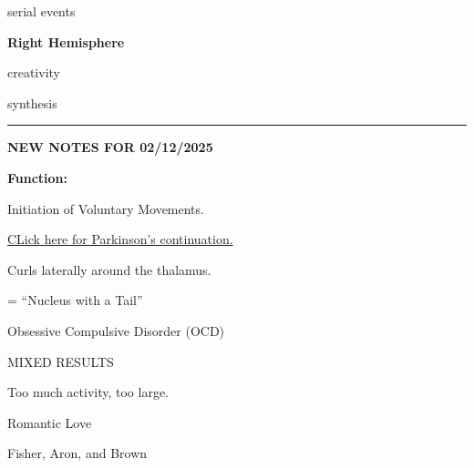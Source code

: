 \begin{coloredlist}
\begin{coloredlist}
\begin{coloredlist}
\begin{coloredlist}
                \item serial events
            \end{coloredlist}
            \item \textbf{Right Hemisphere}
            \begin{coloredlist}
                \item creativity
                \item synthesis
            \end{coloredlist}
        \end{coloredlist}
    \end{coloredlist}
    \begin{center}
        \hrule
        \textbf{NEW NOTES FOR 02/12/2025}
    \end{center}
    \item {}
    \begin{coloredlist}
    \item \textbf{Function:}
    \begin{coloredlist}
        \item Initiation of Voluntary Movements.
        \item \hyperref[parkinson]{CLick here for Parkinson's continuation.}
    \end{coloredlist}
    \item Curls laterally around the thalamus.
    \item {}
    \begin{coloredlist}
        \item {} = ``Nucleus with a Tail''
        \begin{coloredlist}
            \item Obsessive Compulsive Disorder (OCD)
            \begin{coloredlist}
                \item MIXED RESULTS
                \begin{coloredlist}
                    \item Too much activity, too large.
                \end{coloredlist}
            \end{coloredlist}
            \item Romantic Love
            \begin{coloredlist}
                \item Fisher, Aron, and Brown
                \begin{coloredlist}

\end{coloredlist}
\end{coloredlist}
\end{coloredlist}
\end{coloredlist}
\end{coloredlist}
\end{coloredlist}
